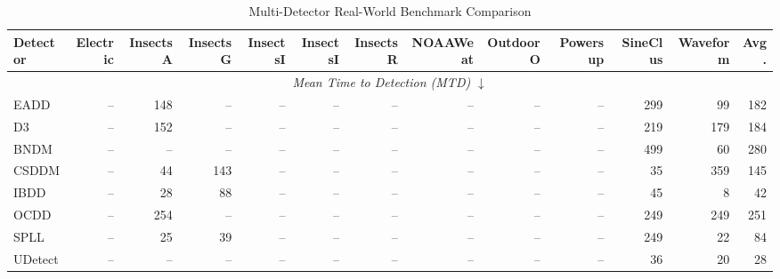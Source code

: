 \begin{table}[htbp]
\centering
\caption{Multi-Detector Real-World Benchmark Comparison}
\label{tab:exp6_realworld}
\small
\begin{tabular}{l|rrrrrrrrrrr|r}
\hline
Detector & Electric & InsectsA & InsectsG & InsectsI & InsectsI & InsectsR & NOAAWeat & OutdoorO & Powersup & SineClus & Waveform & Avg. \\
\hline
\multicolumn{13}{c}{\textit{Mean Time to Detection (MTD)} $\downarrow$} \\
\hline
EADD & -- & 148 & -- & -- & -- & -- & -- & -- & -- & 299 & 99 & 182 \\
D3 & -- & 152 & -- & -- & -- & -- & -- & -- & -- & 219 & 179 & 184 \\
BNDM & -- & -- & -- & -- & -- & -- & -- & -- & -- & 499 & 60 & 280 \\
CSDDM & -- & 44 & 143 & -- & -- & -- & -- & -- & -- & 35 & 359 & 145 \\
IBDD & -- & 28 & 88 & -- & -- & -- & -- & -- & -- & 45 & 8 & 42 \\
OCDD & -- & 254 & -- & -- & -- & -- & -- & -- & -- & 249 & 249 & 251 \\
SPLL & -- & 25 & 39 & -- & -- & -- & -- & -- & -- & 249 & 22 & 84 \\
UDetect & -- & -- & -- & -- & -- & -- & -- & -- & -- & 36 & 20 & 28 \\
\hline
\end{tabular}
\end{table}